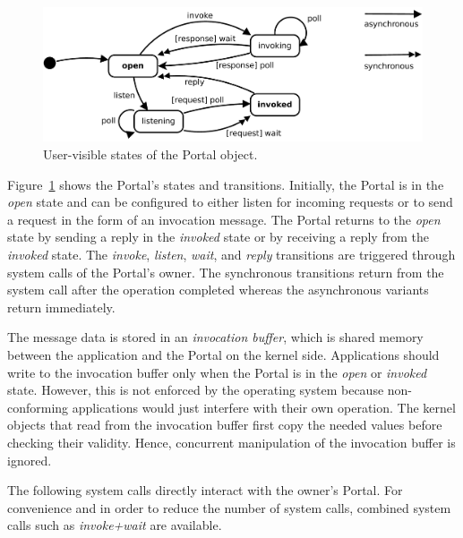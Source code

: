 \begin{figure}
\begin{center}
\includegraphics[scale=0.25]{fig/portal.pdf}
\caption{User-visible states of the Portal object.}
\label{fig:portal:state}
\end{center}
\end{figure}

Figure~\ref{fig:portal:state} shows the Portal's states and transitions. Initially, the Portal is in the \emph{open} state and can be configured to either listen for incoming requests or to send a request in the form of an invocation message. The Portal returns to the \emph{open} state by sending a reply in the \emph{invoked} state or by receiving a reply from the \emph{invoked} state. The \emph{invoke}, \emph{listen}, \emph{wait}, and \emph{reply} transitions are triggered through system calls of the Portal's owner. The synchronous transitions return from the system call after the operation completed whereas the asynchronous variants return immediately. 

The message data is stored in an \emph{invocation buffer}, which is shared memory between the application and the Portal on the kernel side. Applications should write to the invocation buffer only when the Portal is in the \emph{open} or \emph{invoked} state. However, this is not enforced by the operating system because non-conforming applications would just interfere with their own operation. The kernel objects that read from the invocation buffer first copy the needed values before checking their validity. Hence, concurrent manipulation of the invocation buffer is ignored.

The following system calls directly interact with the owner's Portal. For convenience and in order to reduce the number of system calls, combined system calls such as \emph{invoke+wait} are available.

